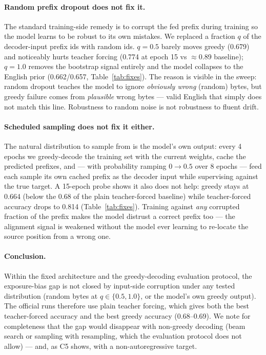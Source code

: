 \documentclass[11pt]{article}
\begin{document}
\paragraph{Random prefix dropout does not fix it.}
The standard training-side remedy is to corrupt the fed prefix during training so
the model learns to be robust to its own mistakes. We replaced a fraction $q$ of
the decoder-input prefix ids with random ids. $q{=}0.5$ barely moves greedy
(0.679) and noticeably hurts teacher forcing (0.774 at epoch 15 vs $\approx$0.89
baseline); $q{=}1.0$ removes the bootstrap signal entirely and the model collapses
to the English prior (0.662/0.657, Table~\ref{tab:fixes}). The reason is visible
in the sweep: random dropout teaches the model to ignore \emph{obviously wrong}
(random) bytes, but greedy failure comes from \emph{plausible} wrong bytes ---
valid English that simply does not match this line. Robustness to random noise is
not robustness to fluent drift.

\paragraph{Scheduled sampling does not fix it either.}
The natural distribution to sample from is the model's own output: every 4 epochs
we greedy-decode the training set with the current weights, cache the predicted
prefixes, and --- with probability ramping $0 \to 0.5$ over 8 epochs --- feed each
sample its own cached prefix as the decoder input while supervising against the
true target. A 15-epoch probe shows it also does not help: greedy stays at 0.664
(below the 0.68 of the plain teacher-forced baseline) while teacher-forced
accuracy drops to 0.814 (Table~\ref{tab:fixes}). Training against \emph{any}
corrupted fraction of the prefix makes the model distrust a correct prefix too ---
the alignment signal is weakened without the model ever learning to re-locate the
source position from a wrong one.

\paragraph{Conclusion.}
Within the fixed architecture and the greedy-decoding evaluation protocol, the
exposure-bias gap is not closed by input-side corruption under any tested
distribution (random bytes at $q \in \{0.5, 1.0\}$, or the model's own greedy
output). The official runs therefore use plain teacher forcing, which gives both
the best teacher-forced accuracy and the best greedy accuracy (0.68--0.69). We
note for completeness that the gap would disappear with non-greedy decoding
(beam search or sampling with resampling, which the evaluation protocol does not
allow) --- and, as C5 shows, with a non-autoregressive target.
\end{document}
